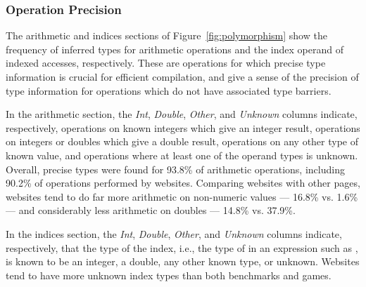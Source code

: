 \subsubsection{Operation Precision}
\label{sec:operations}

The arithmetic and indices sections of Figure~\ref{fig:polymorphism} show the frequency
of inferred types for arithmetic operations and the index operand of
indexed accesses, respectively.
These are operations for which precise type information is crucial
for efficient compilation, and give a sense of the precision of type
information for operations which do not have associated type barriers.

In the arithmetic section, the {\it Int}, {\it Double}, {\it Other},
and {\it Unknown} columns indicate,
respectively,
operations on known integers which give an integer result,
operations on integers or doubles which give a double result,
operations on any other type of known value,
and operations where at least one of the operand types is unknown.
Overall, precise types were found for 93.8\% of arithmetic operations,
including 90.2\% of operations performed by websites.
Comparing websites with other pages, websites tend to do far more
arithmetic on non-numeric values --- 16.8\% vs. 1.6\% ---
and considerably less arithmetic on doubles --- 14.8\% vs. 37.9\%.

In the indices section, the {\it Int}, {\it Double}, {\it Other}, and
{\it Unknown} columns indicate, respectively, that the type of the index, i.e.,
the type of  in an expression such as , is known
to be an integer, a double, any other known type, or unknown. Websites tend to
have more unknown index types than both benchmarks and games.

